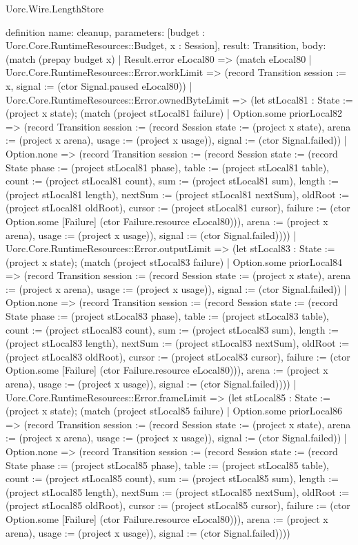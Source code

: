 \begin{lexlean}{Uorc.Wire.LengthStore}
\begin{semanticmodule}
definition{
  name: cleanup,
  parameters: [budget : Uorc.Core.RuntimeResources::Budget, x : Session],
  result: Transition,
  body: (match (prepay budget x)
    | Result.error eLocal80 => (match eLocal80
      | Uorc.Core.RuntimeResources::Error.workLimit => (record Transition {session := x, signal := (ctor Signal.paused eLocal80)})
      | Uorc.Core.RuntimeResources::Error.ownedByteLimit => (let stLocal81 : State := (project x state); (match (project stLocal81 failure)
        | Option.some priorLocal82 => (record Transition {session := (record Session {state := (project x state), arena := (project x arena), usage := (project x usage)}), signal := (ctor Signal.failed)})
        | Option.none => (record Transition {session := (record Session {state := (record State {phase := (project stLocal81 phase), table := (project stLocal81 table), count := (project stLocal81 count), sum := (project stLocal81 sum), length := (project stLocal81 length), nextSum := (project stLocal81 nextSum), oldRoot := (project stLocal81 oldRoot), cursor := (project stLocal81 cursor), failure := (ctor Option.some [Failure] (ctor Failure.resource eLocal80))}), arena := (project x arena), usage := (project x usage)}), signal := (ctor Signal.failed)})))
      | Uorc.Core.RuntimeResources::Error.outputLimit => (let stLocal83 : State := (project x state); (match (project stLocal83 failure)
        | Option.some priorLocal84 => (record Transition {session := (record Session {state := (project x state), arena := (project x arena), usage := (project x usage)}), signal := (ctor Signal.failed)})
        | Option.none => (record Transition {session := (record Session {state := (record State {phase := (project stLocal83 phase), table := (project stLocal83 table), count := (project stLocal83 count), sum := (project stLocal83 sum), length := (project stLocal83 length), nextSum := (project stLocal83 nextSum), oldRoot := (project stLocal83 oldRoot), cursor := (project stLocal83 cursor), failure := (ctor Option.some [Failure] (ctor Failure.resource eLocal80))}), arena := (project x arena), usage := (project x usage)}), signal := (ctor Signal.failed)})))
      | Uorc.Core.RuntimeResources::Error.frameLimit => (let stLocal85 : State := (project x state); (match (project stLocal85 failure)
        | Option.some priorLocal86 => (record Transition {session := (record Session {state := (project x state), arena := (project x arena), usage := (project x usage)}), signal := (ctor Signal.failed)})
        | Option.none => (record Transition {session := (record Session {state := (record State {phase := (project stLocal85 phase), table := (project stLocal85 table), count := (project stLocal85 count), sum := (project stLocal85 sum), length := (project stLocal85 length), nextSum := (project stLocal85 nextSum), oldRoot := (project stLocal85 oldRoot), cursor := (project stLocal85 cursor), failure := (ctor Option.some [Failure] (ctor Failure.resource eLocal80))}), arena := (project x arena), usage := (project x usage)}), signal := (ctor Signal.failed)})))
}
\end{semanticmodule}
\end{lexlean}
